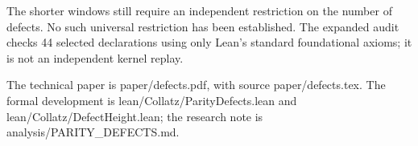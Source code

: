 \documentclass[11pt]{article}
\newcommand{\code}[1]{{\small\ttfamily #1}}
\begin{document}
The shorter windows still require an independent restriction on the
number of defects. No such universal restriction has been established.
The expanded audit checks 44 selected declarations using only Lean's
standard foundational axioms; it is not an independent kernel replay.

The technical paper is \code{paper/defects.pdf}, with source
\code{paper/defects.tex}. The formal development is
\code{lean/Collatz/ParityDefects.lean} and
\code{lean/Collatz/DefectHeight.lean}; the research note is
\code{analysis/PARITY\_\allowbreak{}DEFECTS.md}.
\end{document}
